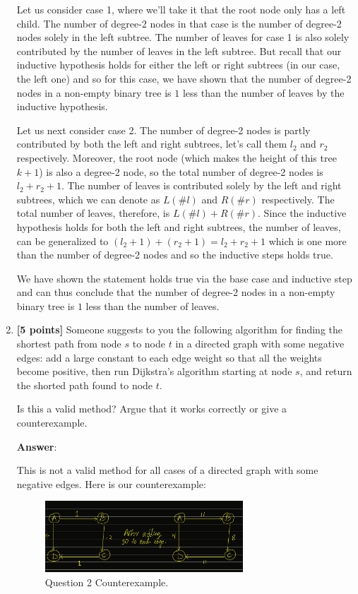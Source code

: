\documentclass[11pt]{article}
\begin{document}
\begin{enumerate}
Let us consider case 1, where we'll take it that the root node only has a left child. The number of degree-2 nodes in that case is the number of degree-2 nodes solely in the left subtree. The number of leaves for case 1 is also solely contributed by the number of leaves in the left subtree. But recall that our inductive hypothesis holds for either the left or right subtrees (in our case, the left one) and so for this case, we have shown that the number of degree-2 nodes in a non-empty binary tree is $1$ less than the number of leaves by the inductive hypothesis.

Let us next consider case 2. The number of degree-2 nodes is partly contributed by both the left and right subtrees, let's call them $l_2$ and $r_2$ respectively. Moreover, the root node (which makes the height of this tree $k+1$) is also a degree-2 node, so the total number of degree-2 nodes is $l_2+r_2+1$. The number of leaves is contributed solely by the left and right subtrees, which we can denote as $L(\#l)$ and $R(\#r)$ respectively. The total number of leaves, therefore, is $L(\#l)+R(\#r)$. Since the inductive hypothesis holds for both the left and right subtrees, the number of leaves, can be generalized to $(l_2+1)+(r_2+1)=l_2+r_2+1$ which is one more than the number of degree-2 nodes and so the inductive steps holds true.

We have shown the statement holds true via the base case and inductive step and can thus conclude that the number of degree-2 nodes in a non-empty binary tree is $1$ less than the number of leaves.

\item \textbf{[5 points]} Someone suggests to you the following algorithm for finding the shortest path from node $s$ to node $t$ in a directed graph with some negative edges:  add a large constant to each edge weight so that all the weights become positive, then run Dijkstra's algorithm starting at node $s$, and return the shorted path found to node $t$.

Is this a valid method? Argue that it works correctly or give a counterexample.

\textbf{Answer}:

This is not a valid method for all cases of a directed graph with some negative edges. Here is our counterexample:

\begin{figure}[h]
\centering
    \includegraphics[width=0.7\textwidth]{Question 2 Counterexample.jpg}
    \caption{Question 2 Counterexample.}
    \label{fig:Q2_Counterexample}
\end{figure}


\end{enumerate}
\end{document}
